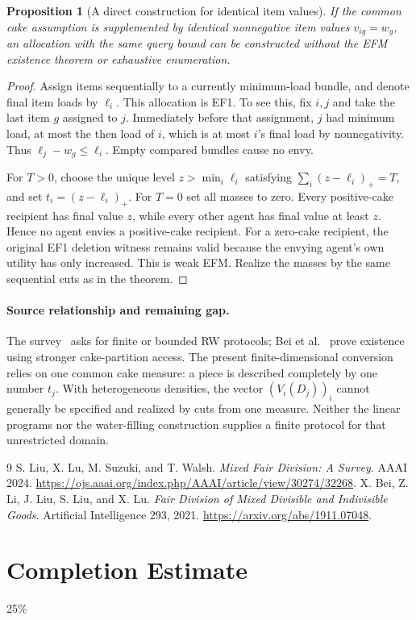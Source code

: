 \documentclass[11pt]{article}
\newtheorem{proposition}{Proposition}
\theoremstyle{definition}
\theoremstyle{remark}
\begin{document}
\begin{proposition}[A direct construction for identical item values]
If the common cake assumption is supplemented by identical nonnegative item values $v_{ig}=w_g$, an allocation with the same query bound can be constructed without the EFM existence theorem or exhaustive enumeration.
\end{proposition}
\begin{proof}
Assign items sequentially to a currently minimum-load bundle, and denote final item loads by $\ell_i$. This allocation is EF1. To see this, fix $i,j$ and take the last item $g$ assigned to $j$. Immediately before that assignment, $j$ had minimum load, at most the then load of $i$, which is at most $i$'s final load by nonnegativity. Thus $\ell_j-w_g\leq\ell_i$. Empty compared bundles cause no envy.

For $T>0$, choose the unique level $z>\min_i\ell_i$ satisfying
$\sum_i(z-\ell_i)_+=T$, and set $t_i=(z-\ell_i)_+$. For $T=0$ set all masses to zero. Every positive-cake recipient has final value $z$, while every other agent has final value at least $z$. Hence no agent envies a positive-cake recipient. For a zero-cake recipient, the original EF1 deletion witness remains valid because the envying agent's own utility has only increased. This is weak EFM. Realize the masses by the same sequential cuts as in the theorem.
\end{proof}

\paragraph{Source relationship and remaining gap.}
The survey~\cite{survey} asks for finite or bounded RW protocols; Bei et al.~\cite{bei} prove existence using stronger cake-partition access. The present finite-dimensional conversion relies on one common cake measure: a piece is described completely by one number $t_j$. With heterogeneous densities, the vector $(V_i(D_j))_i$ cannot generally be specified and realized by cuts from one measure. Neither the linear programs nor the water-filling construction supplies a finite protocol for that unrestricted domain.

\begin{thebibliography}{9}
 S. Liu, X. Lu, M. Suzuki, and T. Walsh.
\emph{Mixed Fair Division: A Survey}. AAAI 2024.
\url{https://ojs.aaai.org/index.php/AAAI/article/view/30274/32268}.
 X. Bei, Z. Li, J. Liu, S. Liu, and X. Lu.
\emph{Fair Division of Mixed Divisible and Indivisible Goods}. Artificial Intelligence 293, 2021.
\url{https://arxiv.org/abs/1911.07048}.
\end{thebibliography}

\section{Completion Estimate}
25\%
\end{document}
